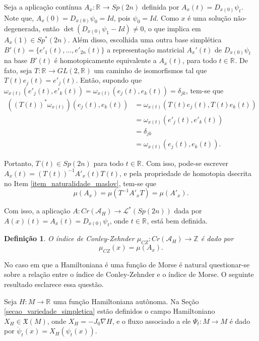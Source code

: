 \documentclass[12pt]{book}
\newtheorem{definicao}[teorema]{Definição}
\newcommand{\caminhosespeciais}[1]{\mathcal{L}^{*}(#1)}
\newcommand{\campohamiltoniano}[1]{X_{H}(#1)}
\newcommand{\campohamiltonianoabrev}{X_{H}}
\newcommand{\campossuaves}[1]{\mathfrak{X}(#1)}
\newcommand{\estruturacomplexa}{J_{0}}
\newcommand{\funcionalH}{\mathcal{A}_{H}}
\newcommand{\generalgroup}[2]{GL(#1, #2)}
\newcommand{\generalgroupreal}[1]{\generalgroup{#1}{\real{}}}
\newcommand{\gruposimpletico}[1]{Sp(#1)}
\newcommand{\gruposimpleticonaodegenerado}[1]{Sp^{#1}(2n)}
\newcommand{\iconley}[1]{\iconleyabrev(#1)}
\newcommand{\iconleyabrev}{\mu_{CZ}}
\newcommand{\inteiros}{\mathbb{Z}}
\newcommand{\pontoscriticos}[1]{\textit{Cr}(#1)}
\newcommand{\real}[1]{\mathbb{R}^{#1}}
\newcommand{\reta}{\real{}}
\begin{document}
	Seja a aplicação contínua $A_{x}:\reta \to \gruposimpletico{2n}$ definida por $A_{x}(t) = D_{x(0)}\psi_{t}$. Note que, $A_{x}(0) = D_{x(0)}\psi_{0}=Id$, pois $\psi_{0}=Id$. Como $x$ é uma solução não-degenerada, então $\det(D_{x(0)}\psi_{1}-Id) \neq 0$, o que implica em $A_{x}(1)\in \gruposimpleticonaodegenerado{*}$. Além disso, escolhida uma outra base simplética $B'(t) = \{e'_{1}(t), \dots, e'_{2n}(t)\}$ a representação matricial $A_{x}'(t)$ de $D_{x(0)}\psi_{t}$ na base $B'(t)$ é homotopicamente equivalente a $A_{x}(t)$, para todo $t \in \reta$. De fato, seja $T:\reta \to \generalgroupreal{2}$ um caminho de isomorfismos tal que $T(t)e_{j}(t) = e'_{j}(t)$. Então, supondo que $\omega_{x(t)}(e'_{j}(t), e'_{k}(t))=\omega_{x(t)}(e_{j}(t), e_{k}(t))=\delta_{jk}$, tem-se que
	$$
	\begin{aligned}
			((T(t))^{*}\omega_{x(t)})(e_{j}(t), e_{k}(t))
		&=
		\omega_{x(t)}(T(t)e_{j}(t), T(t)e_{k}(t))
		\\
		&=\omega_{x(t)}(e'_{j}(t), e'_{k}(t)) 
		\\
		&=\delta_{jk}
		\\
		&=\omega_{x(t)}(e_{j}(t), e_{k}(t)). 
	\end{aligned}
	$$
	
	Portanto, $T(t)\in \gruposimpletico{2n}$ para todo $t\in \reta$. Com isso, pode-se escrever $A_{x}(t) = (T(t))^{-1}A'_{x}(t)T(t)$, e pela propriedade de homotopia dsecrita no Item \ref{item_naturalidade_maslov}, tem-se que 
	$$
	\mu(A_{x}) = \mu(T^{-1}A'_{x}T) = \mu(A'_{x}).
	$$

	Com isso, a aplicação $A: \pontoscriticos{\funcionalH} \to \caminhosespeciais{\gruposimpletico{2n}}$ dada por $A(x)(t) =A_{x}(t)= D_{x(0)}\psi_{t}$, onde $t \in \reta$, está bem definida.
	
	\begin{definicao}
		O índice de Conley-Zehnder $\iconleyabrev:\pontoscriticos{\funcionalH} \to \inteiros$ é dado por 
		$$
		\iconley{x} = \mu(A_{x}).
		$$
	\end{definicao}
	
	No caso em que a Hamiltoniana é uma função de Morse é natural questionar-se sobre a relação entre o índice de Conley-Zehnder e o índice de Morse. O seguinte resultado esclarece essa questão.
	
	Seja $H:M \to \reta$ uma função Hamiltoniana autônoma. Na Seção \ref{secao_variedade_simpletica} estão definidos o campo Hamiltoniano $\campohamiltonianoabrev\in \campossuaves{M}$, onde $\campohamiltonianoabrev=-\estruturacomplexa\nabla H$, e o fluxo associado a ele $\Psi_{t}:M\to M$ é dado por $\dot{\psi}_{t}(x)=\campohamiltoniano{\psi_{t}(x)}$.
	
\end{document}
